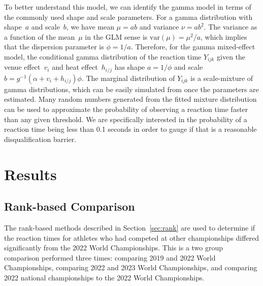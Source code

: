 \documentclass[12pt, letterpaper, titlepage]{article}
\begin{document}
To better understand this model, we can identify the gamma model in terms of the
commonly used shape and scale parameters. For a gamma distribution with
shape~$a$ and scale~$b$, we have mean $\mu = ab$ and variance $\nu = ab^2$. The
variance as a function of the mean~$\mu$ in the GLM sense is
$\text{var}(\mu) = \mu^2 / a$, which implies that the dispersion parameter is
$\phi = 1 / a$. Therefore, for the gamma mixed-effect model, the conditional
gamma distribution of the reaction time $Y_{ijk}$ given the venue
effect~$v_i$ and heat effect~$h_{i/j}$
has shape $a = 1 / \phi$ and scale
$b = g^{-1}(\alpha + v_i + h_{i/j}) \phi$. The marginal
distribution of $Y_{ijk}$ is a scale-mixture of gamma distributions, which can be
easily simulated from once the parameters are estimated. Many
random numbers generated from the fitted mixture distribution can be used to
approximate the probability of observing a reaction time faster than any given
threshold.  We are specifically interested in the probability of a reaction time
being less than 0.1 seconds in order to gauge if that is a reasonable 
disqualification barrier.


\section{Results} \label{sec:Results}

\subsection{Rank-based Comparison} \label{subsec:Results_Rank}

The rank-based methods described in Section~\ref{sec:rank} are used
to determine if the reaction times for athletes who had competed at other 
championships differed significantly from the 2022 World Championships.  This is
a two group comparison performed three times: comparing 2019 and 2022 World
Championships, comparing 2022 and 2023 World Championships, and comparing 2022 
national championships to the 2022 World Championships.
\end{document}
